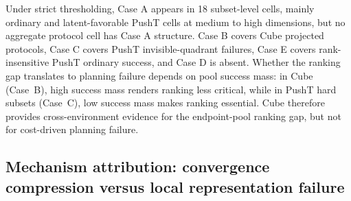\begin{table}[t]
\centering
\small
{}
\caption{Taxonomy for endpoint-planning relations. The cases distinguish endpoint representation quality, final-pool rank quality, success mass in the final pool, and success of the cost-selected rank-1 action.}
\label{tab:taxonomy}
\end{table}

Under strict thresholding, Case A appears in 18 subset-level cells, mainly ordinary and latent-favorable PushT cells at medium to high dimensions, but no aggregate protocol cell has Case A structure. Case B covers Cube projected protocols, Case C covers PushT invisible-quadrant failures, Case E covers rank-insensitive PushT ordinary success, and Case D is absent.
Whether the ranking gap translates to planning failure depends on pool success mass: in Cube (Case~B), high success mass renders ranking less critical, while in PushT hard subsets (Case~C), low success mass makes ranking essential. Cube therefore provides cross-environment evidence for the endpoint-pool ranking gap, but not for cost-driven planning failure.

\subsection{Mechanism attribution: convergence compression versus local representation failure}

